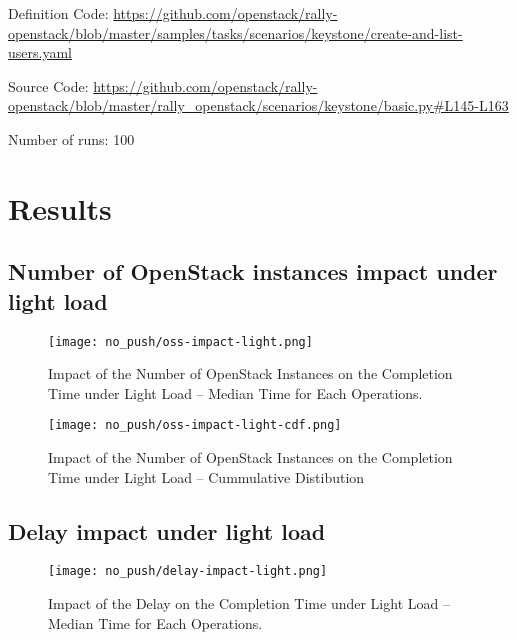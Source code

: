 Definition Code: \url{https://github.com/openstack/rally-openstack/blob/master/samples/tasks/scenarios/keystone/create-and-list-users.yaml}

Source Code: \url{https://github.com/openstack/rally-openstack/blob/master/rally\_openstack/scenarios/keystone/basic.py#L145-L163}

Number of runs: 100

\section{Results}
\label{results}

\subsection{Number of OpenStack instances impact under light load}
\begin{figure}[H]
  \vspace{-10pt}
  \centering
  \centerline{\texttt{[image: no\_push/oss-impact-light.png]}}
  \vspace{-5pt}
  \caption{Impact of the Number of OpenStack Instances on the Completion Time under Light Load – Median Time for Each Operations.}
  \vspace{-5pt}
  \label{fig:oss-impact-light}
\end{figure}


\begin{figure}[H]
  \vspace{-10pt}
  \centering
  \centerline{\texttt{[image: no\_push/oss-impact-light-cdf.png]}}
  \vspace{-5pt}
  \caption{Impact of the Number of OpenStack Instances on the Completion Time under Light Load – Cummulative Distibution}
  \vspace{-5pt}
  \label{fig:oss-impact-light-cdf}
\end{figure}

\subsection{Delay impact under light load}
\begin{figure}[H]
  \vspace{-10pt}
  \centering
  \centerline{\texttt{[image: no\_push/delay-impact-light.png]}}
  \vspace{-5pt}
  \caption{Impact of the Delay on the Completion Time under Light Load – Median Time for Each Operations.}
  \vspace{-5pt}
  \label{fig:delay-impact-light}
\end{figure}

